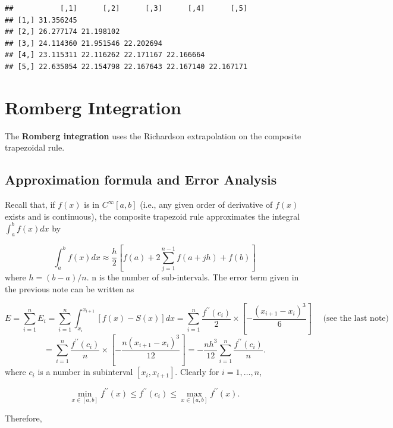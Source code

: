 \documentclass[
]{book}
\begin{document}
\begin{verbatim}
##           [,1]      [,2]      [,3]      [,4]      [,5]
## [1,] 31.356245                                        
## [2,] 26.277174 21.198102                              
## [3,] 24.114360 21.951546 22.202694                    
## [4,] 23.115311 22.116262 22.171167 22.166664          
## [5,] 22.635054 22.154798 22.167643 22.167140 22.167171
\end{verbatim}

\hfill\break

\hypertarget{romberg-integration}{%
\section{Romberg Integration}\label{romberg-integration}}

The \textbf{Romberg integration} uses the Richardson extrapolation on the composite trapezoidal rule.

\hfill\break

\hypertarget{approximation-formula-and-error-analysis}{%
\subsection{Approximation formula and Error Analysis}\label{approximation-formula-and-error-analysis}}

Recall that, if \(f(x)\) is in \(C^\infty[a,b]\) (i.e., any given order of derivative of \(f(x)\) exists and is continuous), the composite trapezoid rule approximates the integral \(\int_a^bf(x)dx\) by

\[
\int_a^bf(x)dx \approx \frac{h}{2}\left[f(a) + 2\sum_{j=1}^{n-1}f(a + jh) + f(b) \right]
\]
where \(h=(b-a)/n\). n is the number of sub-intervals. The error term given in the previous note can be written as

\[
E = \sum_{i=1}^nE_i =  \sum_{i=1}^n \int_{x_i}^{x_{i+1}}\left[ f(x)-S(x)\right]dx  = \sum_{i=1}^n\frac{f^{\prime\prime}(c_i)}{2}\times\left[-\frac{(x_{i+1}-x_i )^3}{6}\right] ~~~~~~ \text{(see the last note)}
\]
\[
= \sum_{i=1}^n\frac{f^{\prime\prime}(c_i)}{n}\times\left[-\frac{n(x_{i+1}-x_i )^3}{12}\right] = -\frac{nh^3}{12}\sum_{i=1}^n\frac{f^{\prime\prime}(c_i)}{n}.
\]
where \(c_i\) is a number in subinterval \([x_i, x_{i+1}]\). Clearly for \(i = 1, …, n\),

\[
\min_{x\in[a,b]} f^{\prime\prime}(x) \le f^{\prime\prime}(c_i) \le \max_{x\in[a,b]} f^{\prime\prime}(x).
\]

Therefore,
\end{document}
